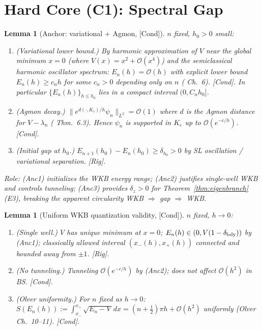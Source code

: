 \documentclass[12pt,a4paper]{amsart}
\newtheorem{lemma}[theorem]{Lemma}
\theoremstyle{definition}
\theoremstyle{remark}
\newcommand{\Rig}{\textup{[Rig]}}
\newcommand{\Cond}{\textup{[Cond]}}
\begin{document}
\section{Hard Core (C1): Spectral Gap}
\label{sec:specgap}

\begin{lemma}[Anchor: variational + Agmon, \Cond]
\label{lem:anchor}
$n$ fixed, $h_0>0$ small:
\begin{enumerate}[{\rm(Anc1)}]
\item \textit{(Variational lower bound.)}
  By harmonic approximation of $V$ near the global minimum $x=0$
  (where $V(x)=x^2+\mathcal{O}(x^4)$) and the
  semiclassical harmonic oscillator spectrum:
  $E_n(h)=\mathcal{O}(h)$ with explicit lower bound
  $E_n(h)\ge c_n h$ for some $c_n>0$ depending only on $n$
  (\cite{Zworski2012} Ch.~6). \Cond.
  In particular $\{E_n(h)\}_{h\le h_0}$ lies in a compact interval $(0,C_n h_0]$.
\item \textit{(Agmon decay.)}
  $\|e^{d(\cdot,K_\varepsilon)/h}\psi_n\|_{L^2}=\mathcal{O}(1)$
  where $d$ is the Agmon distance for $V-\lambda_n$
  (\cite{Zworski2012} Thm.~6.3).
  Hence $\psi_n$ is supported in $K_\varepsilon$ up to $\mathcal{O}(e^{-c/h})$. \Cond.
\item \textit{(Initial gap at $h_0$.)}
  $E_{n+1}(h_0)-E_n(h_0)\ge\delta_{h_0}>0$
  by SL oscillation / variational separation. \Rig.
\end{enumerate}
\emph{Role:} (Anc1) initializes the WKB energy range;
(Anc2) justifies single-well WKB and controls tunneling;
(Anc3) provides $\delta_z>0$ for Theorem~\ref{thm:eigenbranch}(E3),
breaking the apparent circularity
WKB $\Rightarrow$ gap $\Rightarrow$ WKB.
\end{lemma}

\begin{lemma}[Uniform WKB quantization validity, \Cond]
\label{lem:wkb-validity}
$n$ fixed, $h\to 0$:
\begin{enumerate}[{\rm(W1)}]
\item \textit{(Single well.)} $V$ has unique minimum at $x=0$;
  $E_n(h)\in(0,V(1-\delta_{\rm bdy}))$ by (Anc1);
  classically allowed interval $(x_-(h),x_+(h))$ connected
  and bounded away from $\pm 1$. \Rig.
\item \textit{(No tunneling.)} Tunneling $\mathcal{O}(e^{-c/h})$
  by (Anc2); does not affect $\mathcal{O}(h^2)$ in BS. \Cond.
\item \textit{(Olver uniformity.)} For $n$ fixed as $h\to 0$:
  $S(E_n(h)):=\int_{x_-}^{x_+}\sqrt{E_n-V}\,dx
  =(n+\tfrac12)\pi h+\mathcal{O}(h^2)$
  uniformly
  (Olver \cite{Olver1974} Ch.~10--11). \Cond.
\end{enumerate}
\end{lemma}
\end{document}
